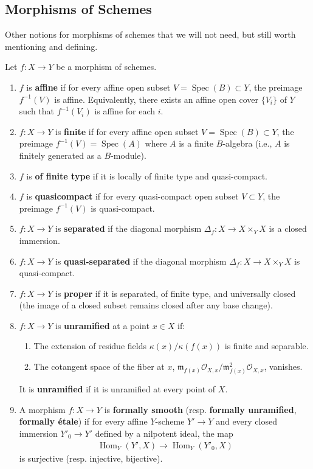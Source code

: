 \documentclass[12pt]{article}
\begin{document}
\subsection{Morphisms of Schemes}
Other notions for morphisms of schemes that we will not need, but still worth mentioning and defining.
\begin{definition}
    Let $f: X \to Y$ be a morphism of schemes.
    \begin{enumerate}
        \item $f$ is \textbf{affine} if for every affine open subset $V = \operatorname{Spec}(B) \subset Y$, the preimage $f^{-1}(V)$ is affine. Equivalently, there exists an affine open cover $\{V_i\}$ of $Y$ such that $f^{-1}(V_i)$ is affine for each $i$.

        \item $f: X \to Y$ is \textbf{finite} if for every affine open subset $V = \operatorname{Spec}(B) \subset Y$, the preimage $f^{-1}(V) = \operatorname{Spec}(A)$ where $A$ is a finite $B$-algebra (i.e., $A$ is finitely generated as a $B$-module).
        \item $f$ is \textbf{of finite type} if it is locally of finite type and quasi-compact.

        \item $f$ is \textbf{quasicompact} if for every quasi-compact open subset $V \subset Y$, the preimage $f^{-1}(V)$ is quasi-compact.
        \item $f: X \to Y$ is \textbf{separated} if the diagonal morphism $\Delta_f: X \to X \times_Y X$ is a closed immersion.
        \item $f: X \to Y$ is \textbf{quasi-separated} if the diagonal morphism $\Delta_f: X \to X \times_Y X$ is quasi-compact.
        \item $f: X \to Y$ is \textbf{proper} if it is separated, of finite type, and universally closed (the image of a closed subset remains closed after any base change).
        \item $f: X \to Y$ is \textbf{unramified} at a point $x \in X$ if:
              \begin{enumerate}
                  \item The extension of residue fields $\kappa(x)/\kappa(f(x))$ is finite and separable.
                  \item The cotangent space of the fiber at $x$, $\mathfrak{m}_{f(x)}\mathcal{O}_{X,x}/\mathfrak{m}_{f(x)}^2\mathcal{O}_{X,x}$, vanishes.
              \end{enumerate}
              It is \textbf{unramified} if it is unramified at every point of $X$.
        \item A morphism $f: X \to Y$ is \textbf{formally smooth} (resp. \textbf{formally unramified}, \textbf{formally étale}) if for every affine $Y$-scheme $Y' \to Y$ and every closed immersion $Y'_0 \to Y'$ defined by a nilpotent ideal, the map
              \begin{align*}
                  \operatorname{Hom}_Y(Y', X) \to \operatorname{Hom}_Y(Y'_0, X)
              \end{align*}
              is surjective (resp. injective, bijective).


\end{enumerate}
\end{definition}
\end{document}
